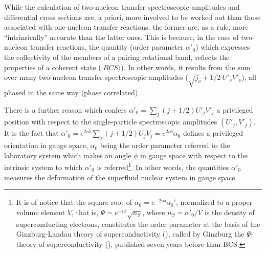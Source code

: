 While the calculation of two-nucleon transfer spectroscopic amplitudes and differential cross sections are, a priori, more involved to be worked out than those associated with one-nucleon transfer reactions, the former are, as a rule, more ``intrinsically'' accurate than the latter ones. This is because, in the case of two-nucleon transfer reactions, the quantity (order parameter $\alpha'_0$) which expresses the collectivity of the members of a pairing rotational band, reflects the properties of a coherent state ($|BCS\rangle$). In other words, it results from the sum over many two-nucleon transfer spectroscopic amplitudes ($\sqrt{j_{\nu}+1/2}\,U'_\nu V'_\nu$), all phased in the same way (phase correlated).

There is a further reason which confers $\alpha'_0=\sum_j(j+1/2)U'_jV'_j$ a privileged position with respect to the single-particle spectroscopic amplitudes  $(U'_j, V'_j)$. It is the fact that $\alpha'_0=e^{2i\phi}\sum_j(j+1/2)U_jV_j=e^{2i\phi}\alpha_0$ defines a privileged orientation in gauge space, $\alpha_0$ being the order parameter referred to the laboratory system which makes an angle $\phi$ in gauge space with respect to the intrinsic system to which $\alpha'_0$ is referred\footnote{It is of notice that the square root of $\alpha_0=e^{-2i\phi}\alpha_0'$, normalized to a proper volume element $V$, that is, $\Psi=e^{-i\phi}\sqrt{n_S}$, where $n_S=\alpha'_0/V$ is the density of superconducting electrons, constitutes the order parameter at the basis of the Ginzburg-Landau theory of superconductivity (\cite{Ginzburg:50}), called by Ginzburg the $\Psi$-theory of superconductivity (\cite{Ginzburg:04}), published seven years before than BCS.}. In other words, the quantities $\alpha'_0$  measures the deformation of the superfluid nuclear system in gauge space. 

